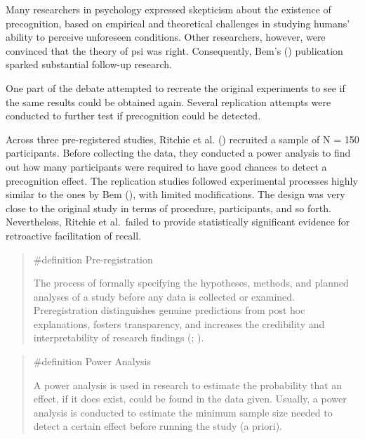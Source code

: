 \documentclass[
  letterpaper,
]{book}
\begin{document}
Many researchers in psychology expressed skepticism about the existence
of precognition, based on empirical and theoretical challenges in
studying humans' ability to perceive unforeseen conditions. Other
researchers, however, were convinced that the theory of psi was right.
Consequently, Bem's () publication
sparked substantial follow-up research.

One part of the debate attempted to recreate the original experiments to
see if the same results could be obtained again. Several replication
attempts were conducted to further test if precognition could be
detected.

Across three pre-registered studies, Ritchie et al.
() recruited a sample of N
= 150 participants. Before collecting the data, they conducted a power
analysis to find out how many participants were required to have good
chances to detect a precognition effect. The replication studies
followed experimental processes highly similar to the ones by Bem
(), with limited modifications. The
design was very close to the original study in terms of procedure,
participants, and so forth. Nevertheless, Ritchie et al.~failed to
provide statistically significant evidence for retroactive facilitation
of recall.

\begin{quote}
\label{def-preregistration}{\#definition}
Pre-registration

The process of formally specifying the hypotheses, methods, and planned
analyses of a study before any data is collected or examined.
Preregistration distinguishes genuine predictions from post hoc
explanations, fosters transparency, and increases the credibility and
interpretability of research findings
(;
).
\end{quote}

\begin{quote}
\label{def-poweranalysis}{\#definition} Power Analysis

A power analysis is used in research to estimate the probability that an
effect, if it does exist, could be found in the data given. Usually, a
power analysis is conducted to estimate the minimum sample size needed
to detect a certain effect before running the study (a priori).
\end{quote}
\end{document}
